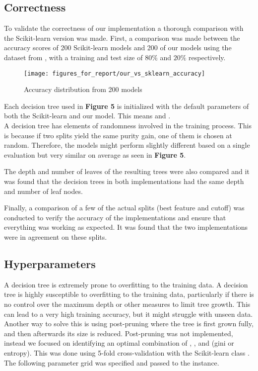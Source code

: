 \subsection{Correctness}
To validate the correctness of our implementation a thorough comparison with the Scikit-learn version was made.
First, a comparison was made between the accuracy scores of 200 Scikit-learn models and 200 of our models using the  dataset from , with a training and test size of $80\%$ and $20\%$ respectively.

\begin{figure}[H]
    \centering
    \texttt{[image: figures\_for\_report/our\_vs\_sklearn\_accuracy]}
    \captionsetup{justification=centering,margin=2cm}
    \caption{Accuracy distribution from 200 models}
\end{figure}

Each decision tree used in \textbf{Figure 5} is initialized with the default parameters of both the Scikit-learn and our model.
This means  and . \\

A decision tree has elements of randomness involved in the training process.
This is because if two splits yield the same purity gain, one of them is chosen at random.
Therefore, the models might perform slightly different based on a single evaluation but very similar on average as seen in \textbf{Figure 5}.
\newline

The depth and number of leaves of the resulting trees were also compared and it was found that the decision trees in both implementations had the same depth and number of leaf nodes.
\newline

Finally, a comparison of a few of the actual splits (best feature and cutoff) was conducted to verify the accuracy of the implementations and ensure that everything was working as expected.
It was found that the two implementations were in agreement on these splits.

\subsection{Hyperparameters}
A decision tree is extremely prone to overfitting to the training data.
A decision tree is highly susceptible to overfitting to the training data, particularly if there is no control over the maximum depth or other measures to limit tree growth.
This can lead to a very high training accuracy, but it might struggle with unseen data.
Another way to solve this is using post-pruning where the tree is first grown fully, and then afterwards its size is reduced.
Post-pruning was not implemented, instead we focused on identifying an optimal combination of , , and  (gini or entropy).
This was done using 5-fold cross-validation with the Scikit-learn class .
The following parameter grid was specified and passed to the  instance.
\newline

